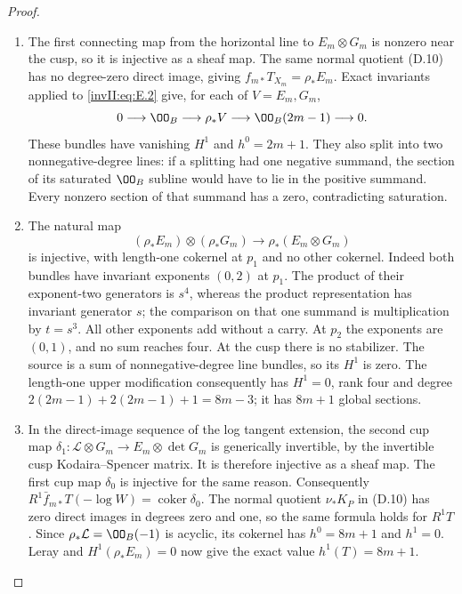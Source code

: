 \begin{proof}
\begin{enumerate}[label={$\langle1\rangle$\arabic*.},leftmargin=*]
\item The first connecting map from the horizontal line to
$E_m\otimes G_m$ is nonzero near the cusp, so it is injective as a
sheaf map. The same normal quotient (D.10) has no degree-zero direct
image, giving $f_{m*}T_{X_m}=\rho_*E_m$.
Exact invariants applied to \eqref{invII:eq:E.2} give, for each of $V=E_m,G_m$,
\[
 0\longrightarrow\OO_B\longrightarrow\rho_*V
 \longrightarrow\OO_B(2m-1)\longrightarrow0.
\]
These bundles have vanishing $H^1$ and $h^0=2m+1$.
They also split into two nonnegative-degree lines: if a splitting
had one negative summand, the section of its saturated $\OO_B$
subline would have to lie in the positive summand. Every nonzero
section of that summand has a zero, contradicting saturation.

\item The natural map
\[
 (\rho_*E_m)\otimes(\rho_*G_m)
              \longrightarrow\rho_*(E_m\otimes G_m)
\]
is injective, with length-one cokernel at $p_1$ and no other
cokernel. Indeed both bundles have invariant exponents $(0,2)$ at
$p_1$. The product of their exponent-two generators is $s^4$,
whereas the product representation has invariant generator $s$;
the comparison on that one summand is multiplication by $t=s^3$.
All other exponents add without a carry. At $p_2$ the exponents
are $(0,1)$, and no sum reaches four. At the cusp there is no
stabilizer. The source is a sum of nonnegative-degree line bundles,
so its $H^1$ is zero. The length-one upper modification consequently
has $H^1=0$, rank four and degree
$2(2m-1)+2(2m-1)+1=8m-3$; it has $8m+1$ global sections.

\item In the direct-image sequence of the log tangent extension, the
second cup map
$\delta_1:\mathcal L\otimes G_m\to E_m\otimes\det G_m$
is generically invertible, by the invertible cusp Kodaira--Spencer
matrix. It is therefore injective as a sheaf map. The first cup map
$\delta_0$ is injective for the same reason. Consequently
$R^1\bar f_{m*}T(-\log W)=\operatorname{coker}\delta_0$.
The normal quotient $\nu_*K_P$ in (D.10) has zero direct images in
degrees zero and one, so the same formula holds for $R^1T$.
Since $\rho_*\mathcal L=\OO_B(-1)$ is acyclic, its cokernel has
$h^0=8m+1$ and $h^1=0$. Leray and $H^1(\rho_*E_m)=0$ now give
the exact value $h^1(T)=8m+1$.


\end{enumerate}
\end{proof}
